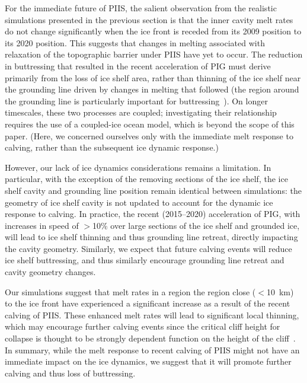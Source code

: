 \documentclass[draft]{agujournal2019}
\begin{document}
For the immediate future of PIIS, the salient observation from the realistic simulations presented in the previous section is that the inner cavity melt rates do not change significantly when the ice front is receded from its 2009 position to its 2020 position. This suggests that changes in melting associated with relaxation of the topographic barrier under PIIS have yet to occur. The reduction in buttressing that resulted in the recent acceleration of PIG \cite{Joughin2021ScienceAdv} must derive primarily from  the loss of ice shelf area, rather than thinning of the ice shelf near the grounding line driven by changes in melting that followed (the region around the grounding line is particularly important for buttressing~\cite{Reese2018NatureClimCh}). On longer timescales, these two processes are coupled; investigating their relationship requires the use of a coupled-ice ocean model, which is beyond the scope of this paper. (Here, we concerned ourselves only with the immediate melt response to calving, rather than the subsequent ice dynamic response.)

However, our lack of ice dynamics considerations remains a limitation. In particular, with the exception of the removing sections of the ice shelf, the ice shelf cavity and grounding line position remain identical between simulations: the geometry of ice shelf cavity is not updated to account for the dynamic ice response to calving. In practice, the recent (2015--2020) acceleration of PIG, with increases in speed of $>$10\% over large sections of the ice shelf and grounded ice, will lead to ice shelf thinning and thus grounding line retreat, directly impacting the cavity geometry. Similarly, we expect that future calving events will reduce ice shelf buttressing, and thus similarly encourage grounding line retreat and cavity geometry changes. 

Our simulations suggest that melt rates in a region the region close ($<$10~km) to the ice front have experienced a significant increase as a result of the recent calving of PIIS. These enhanced melt rates will lead to significant local thinning, which may encourage further calving events since the critical cliff height for collapse is thought to be strongly dependent function on the height of the cliff~\cite[ for example]{Crawford2021NatureComms}. In summary, while the melt response to recent calving of PIIS might not have an immediate impact on the ice dynamics, we suggest that it will promote further calving and thus loss of buttressing.
\end{document}
